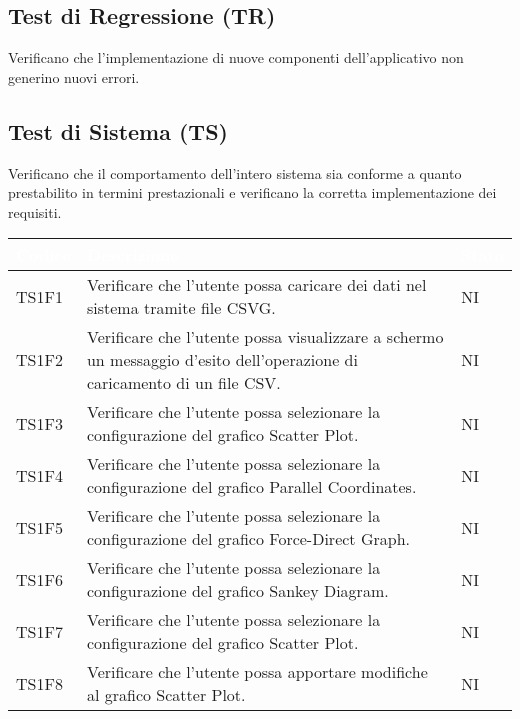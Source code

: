     \subsection{Test di Regressione (TR)} Verificano che l'implementazione di nuove componenti dell'applicativo non generino nuovi errori.

    \subsection{Test di Sistema (TS)} Verificano che il comportamento dell'intero sistema sia conforme a quanto prestabilito in termini prestazionali e verificano la corretta implementazione dei requisiti.
    \begin{center}
        \renewcommand\arraystretch{1.5}
        \centering
        \begin{longtable}{|p{1.5cm}|p{11cm}|p{1cm}|}
        \hline
        \rowcolor[HTML]{036400}
        \textcolor{white}{\textbf{Codice}} & \textcolor{white}{\textbf{Descrizione}} & \textcolor{white}{\textbf{Stato}} \\ \hline
            \rowcolor[HTML]{EFEFEF}
            TS1F1 & Verificare che l’utente possa caricare dei dati nel sistema tramite file CSVG. & NI\\ \hline
            \rowcolor[HTML]{C0C0C0}
            TS1F2 & Verificare che l’utente possa visualizzare a schermo un messaggio d’esito dell’operazione di caricamento di un file CSV.& NI\\ \hline
            \rowcolor[HTML]{EFEFEF}
            TS1F3 & Verificare che l’utente possa selezionare la configurazione del grafico Scatter Plot. & NI\\ \hline
            \rowcolor[HTML]{C0C0C0}
            TS1F4 & Verificare che l’utente possa selezionare la configurazione del grafico Parallel Coordinates. & NI\\ \hline
            \rowcolor[HTML]{EFEFEF}
            TS1F5 & Verificare che l’utente possa selezionare la configurazione del grafico Force-Direct Graph. & NI\\ \hline
            \rowcolor[HTML]{C0C0C0}
            TS1F6 & Verificare che l’utente possa selezionare la configurazione del grafico Sankey Diagram. & NI\\ \hline
            \rowcolor[HTML]{EFEFEF}
            TS1F7 & Verificare che l’utente possa selezionare la configurazione del grafico Scatter Plot. & NI\\ \hline
            \rowcolor[HTML]{C0C0C0}
            TS1F8 & Verificare che l’utente possa apportare modifiche al grafico Scatter Plot. & NI\\ \hline

\end{longtable}
\end{center}
